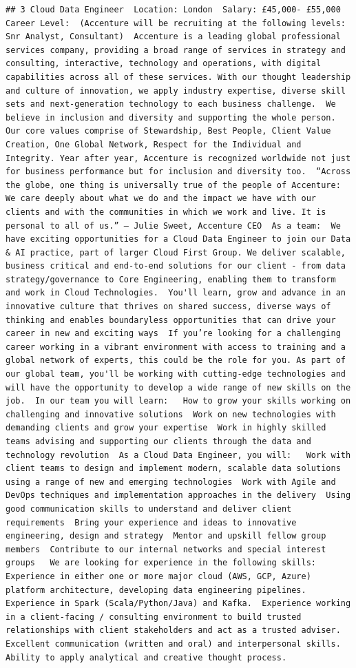 \documentclass[
]{article}
\begin{document}
\begin{verbatim}
## 3 Cloud Data Engineer  Location: London  Salary: £45,000- £55,000  Career Level:  (Accenture will be recruiting at the following levels: Snr Analyst, Consultant)  Accenture is a leading global professional services company, providing a broad range of services in strategy and consulting, interactive, technology and operations, with digital capabilities across all of these services. With our thought leadership and culture of innovation, we apply industry expertise, diverse skill sets and next-generation technology to each business challenge.  We believe in inclusion and diversity and supporting the whole person. Our core values comprise of Stewardship, Best People, Client Value Creation, One Global Network, Respect for the Individual and Integrity. Year after year, Accenture is recognized worldwide not just for business performance but for inclusion and diversity too.  “Across the globe, one thing is universally true of the people of Accenture: We care deeply about what we do and the impact we have with our clients and with the communities in which we work and live. It is personal to all of us.” – Julie Sweet, Accenture CEO  As a team:  We have exciting opportunities for a Cloud Data Engineer to join our Data & AI practice, part of larger Cloud First Group. We deliver scalable, business critical and end-to-end solutions for our client - from data strategy/governance to Core Engineering, enabling them to transform and work in Cloud Technologies.  You'll learn, grow and advance in an innovative culture that thrives on shared success, diverse ways of thinking and enables boundaryless opportunities that can drive your career in new and exciting ways  If you’re looking for a challenging career working in a vibrant environment with access to training and a global network of experts, this could be the role for you. As part of our global team, you'll be working with cutting-edge technologies and will have the opportunity to develop a wide range of new skills on the job.  In our team you will learn:   How to grow your skills working on challenging and innovative solutions  Work on new technologies with demanding clients and grow your expertise  Work in highly skilled teams advising and supporting our clients through the data and technology revolution  As a Cloud Data Engineer, you will:   Work with client teams to design and implement modern, scalable data solutions using a range of new and emerging technologies  Work with Agile and DevOps techniques and implementation approaches in the delivery  Using good communication skills to understand and deliver client requirements  Bring your experience and ideas to innovative engineering, design and strategy  Mentor and upskill fellow group members  Contribute to our internal networks and special interest groups   We are looking for experience in the following skills:   Experience in either one or more major cloud (AWS, GCP, Azure) platform architecture, developing data engineering pipelines.  Experience in Spark (Scala/Python/Java) and Kafka.  Experience working in a client-facing / consulting environment to build trusted relationships with client stakeholders and act as a trusted adviser.  Excellent communication (written and oral) and interpersonal skills.  Ability to apply analytical and creative thought process.  
\end{verbatim}
\end{document}
